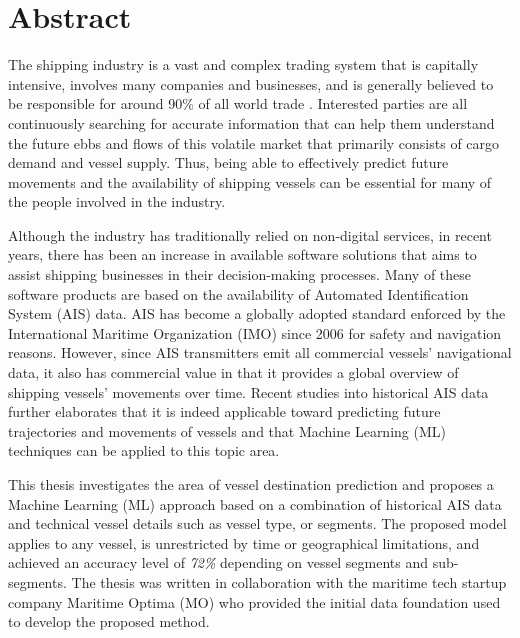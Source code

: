 \chapter*{Abstract}

The shipping industry is a vast and complex trading system that is capitally intensive, involves many companies and businesses, and is generally believed to be responsible for around 90\% of all world trade \parencite{maritime_studies@2011}. Interested parties are all continuously searching for accurate information that can help them understand the future ebbs and flows of this volatile market that primarily consists of cargo demand and vessel supply. Thus, being able to effectively predict future movements and the availability of shipping vessels can be essential for many of the people involved in the industry.

Although the industry has traditionally relied on non-digital services, in recent years, there has been an increase in available software solutions that aims to assist shipping businesses in their decision-making processes. Many of these software products are based on the availability of Automated Identification System (AIS) data. AIS has become a globally adopted standard enforced by the International Maritime Organization (IMO) since 2006 for safety and navigation reasons. However, since AIS transmitters emit all commercial vessels' navigational data, it also has commercial value in that it provides a global overview of shipping vessels' movements over time. Recent studies into historical AIS data further elaborates that it is indeed applicable toward predicting future trajectories and movements of vessels and that Machine Learning (ML) techniques can be applied to this topic area.

This thesis investigates the area of vessel destination prediction and proposes a Machine Learning (ML) approach based on a combination of historical AIS data and technical vessel details such as vessel type, or segments. The proposed model applies to any vessel, is unrestricted by time or geographical limitations, and achieved an accuracy level of \textit{72\%} depending on vessel segments and sub-segments. The thesis was written in collaboration with the maritime tech startup company Maritime Optima (MO) who provided the initial data foundation used to develop the proposed method.
